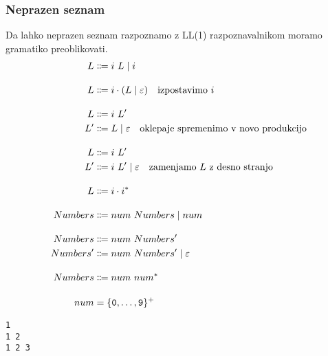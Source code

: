 \documentclass{report}
\newcommand{\Null}{\varepsilon}
\newcommand{\Char}[1]{\texttt{#1}}
\newcommand{\Seq}{\cdot}
\newcommand{\Spc}{\ }
\newcommand{\Union}{\mathrel{|}}
\newcommand{\Kleene}[1]{{#1}^\ast}
\newcommand{\KleenePlus}[1]{#1^+}
\newcommand{\Arrow}{\Coloneq}
\newcommand{\NT}[1]{{#1}}
\newcommand{\T}[1]{{#1}}
\begin{document}
\subsubsection{Neprazen seznam}
Da lahko neprazen seznam razpoznamo z LL(1) razpoznavalnikom moramo gramatiko preoblikovati.
\begin{equation*}
  \begin{aligned}[t]
    \NT{L} &\Arrow \T{i} \Spc \NT{L} \Union \T{i}\\[1em]
    \NT{L} &\Arrow \T{i} \Seq (\NT{L} \Union \Null)\text{\quad izpostavimo $\T{i}$}\\[1em]
    \NT{L} &\Arrow \T{i} \Spc \NT{L'}\\
    \NT{L'} &\Arrow \NT{L} \Union \Null \text{\quad oklepaje spremenimo v novo produkcijo}\\[1em]
    \NT{L} &\Arrow \T{i} \Spc \NT{L'}\\
    \NT{L'} &\Arrow \T{i} \Spc \NT{L'} \Union \Null \text{\quad zamenjamo $\NT{L}$ z desno stranjo}\\[1em]
    \NT{L} &\Arrow \T{i} \Seq \Kleene{\T{i}}\\[1em]
    \NT{Numbers} &\Arrow \T{num} \Spc \NT{Numbers} \Union \T{num}\\[1em]
    \NT{Numbers} &\Arrow \T{num} \Spc \NT{Numbers'}\\
    \NT{Numbers'} &\Arrow \T{num} \Spc \NT{Numbers'} \Union \Null\\[1em]
    \NT{Numbers} &\Arrow \T{num} \Spc \Kleene{\T{num}}\\[1em]
    \T{num} &= \KleenePlus{\{\Char{0}, \dots, \Char{9}\}}
  \end{aligned}
\end{equation*}
\begin{lstlisting}
1
1 2
1 2 3
\end{lstlisting}
\end{document}
